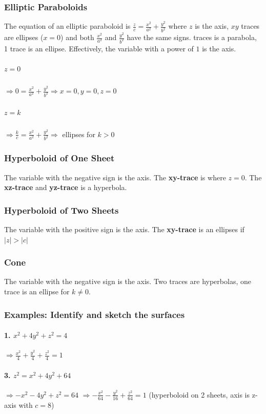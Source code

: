 \documentclass{article}
\begin{document}
\subsubsection{Elliptic Paraboloids}
The equation of an elliptic paraboloid is $\frac{z}{c}=\frac{x^2}{a^2}+\frac{y^2}{b^2}$ where $z$ is the axis, $xy$ traces are ellipses ($x=0$) and both $\frac{x^2}{a^2}$ and $\frac{y^2}{b^2}$ have the same signs.
\newline {} traces is a parabola, 1 trace is an ellipse.
\newline\newline Effectively, the variable with a power of $1$ is the axis.
\subparagraph{$z=0$}$\Rightarrow 0=\frac{x^2}{a^2}+\frac{y^2}{b^2} \Rightarrow x=0,y=0,z=0$
\subparagraph{$z=k$}$\Rightarrow \frac{k}{c}=\frac{x^2}{a^2}+\frac{y^2}{b^2} \Rightarrow$ ellipses for $k>0$

\subsubsection{Hyperboloid of One Sheet}
The variable with the negative sign is the axis. The \textbf{xy-trace} is where $z=0$. The \textbf{xz-trace} and \textbf{yz-trace} is a hyperbola.

\subsubsection{Hyperboloid of Two Sheets}
The variable with the positive sign is the axis. The \textbf{xy-trace} is an ellipses if $\lvert z \rvert > \lvert c \rvert $

\subsubsection{Cone}
The variable with the negative sign is the axis. Two traces are hyperbolas, one trace is an ellipse for $k\ne 0$.

\subsubsection[Exampls]{Examples: Identify and sketch the surfaces}
\paragraph{1. $x^2+4y^2+z^2=4$} $\Rightarrow \frac{x^2}{4}+\frac{y^2}{4}+\frac{z^2}{4}=1$
\paragraph{3. $z^2=x^2+4y^2+64$} $\Rightarrow -x^2-4y^2+z^2=64$
$\Rightarrow -\frac{x^2}{64}-\frac{y^2}{16}+\frac{z^2}{64}=1$ (hyperboloid on 2 sheets, axis is z-axis with $c=8$)
\end{document}

